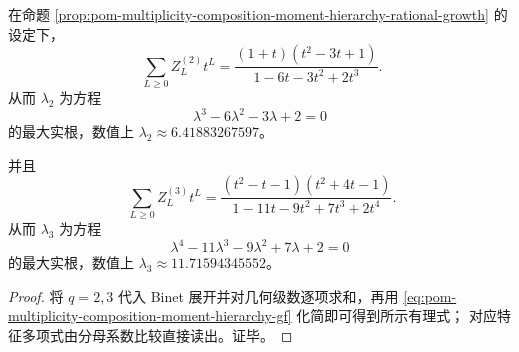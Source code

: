 \begin{corollary}[\texorpdfstring{$q=2,3$}{q=2,3} 的完全闭式母函数与代数增长常数]\label{cor:pom-multiplicity-composition-moment-q2-q3-closed}
在命题 \ref{prop:pom-multiplicity-composition-moment-hierarchy-rational-growth} 的设定下，
\[
\boxed{\;
\sum_{L\ge 0} Z_L^{(2)}t^L=\frac{(1+t)(t^2-3t+1)}{1-6t-3t^2+2t^3}.}
\]
从而 \(\lambda_2\) 为方程
\[
\boxed{\;\lambda^3-6\lambda^2-3\lambda+2=0\;}
\]
的最大实根，数值上 \(\lambda_2\approx 6.41883267597\)。
\par
并且
\[
\boxed{\;
\sum_{L\ge 0} Z_L^{(3)}t^L=\frac{(t^2-t-1)(t^2+4t-1)}{1-11t-9t^2+7t^3+2t^4}.}
\]
从而 \(\lambda_3\) 为方程
\[
\boxed{\;\lambda^4-11\lambda^3-9\lambda^2+7\lambda+2=0\;}
\]
的最大实根，数值上 \(\lambda_3\approx 11.71594345552\)。
\end{corollary}
\begin{proof}
将 \(q=2,3\) 代入 Binet 展开并对几何级数逐项求和，再用 \eqref{eq:pom-multiplicity-composition-moment-hierarchy-gf} 化简即可得到所示有理式；
对应特征多项式由分母系数比较直接读出。证毕。
\end{proof}


